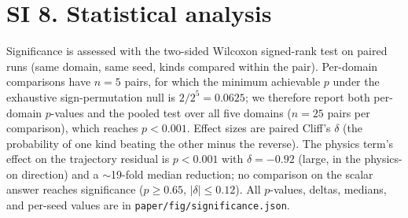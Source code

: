 \documentclass[11pt,a4paper]{article}
\begin{document}
\section*{SI 8. Statistical analysis}

Significance is assessed with the two-sided Wilcoxon signed-rank test on
paired runs (same domain, same seed, kinds compared within the pair).
Per-domain comparisons have $n=5$ pairs, for which the minimum achievable
$p$ under the exhaustive sign-permutation null is $2/2^5 = 0.0625$; we
therefore report both per-domain $p$-values and the pooled test over all
five domains ($n=25$ pairs per comparison), which reaches
$p<0.001$. Effect sizes are paired Cliff's $\delta$ (the probability of
one kind beating the other minus the reverse). The physics term's effect on
the trajectory residual is $p<0.001$ with $\delta=-0.92$ (large, in the
physics-on direction) and a $\sim$19-fold median reduction; no comparison
on the scalar answer reaches significance ($p\geq0.65$, $|\delta|\leq0.12$).
All $p$-values, deltas, medians, and per-seed values are in
\texttt{paper/fig/significance.json}.
\end{document}
